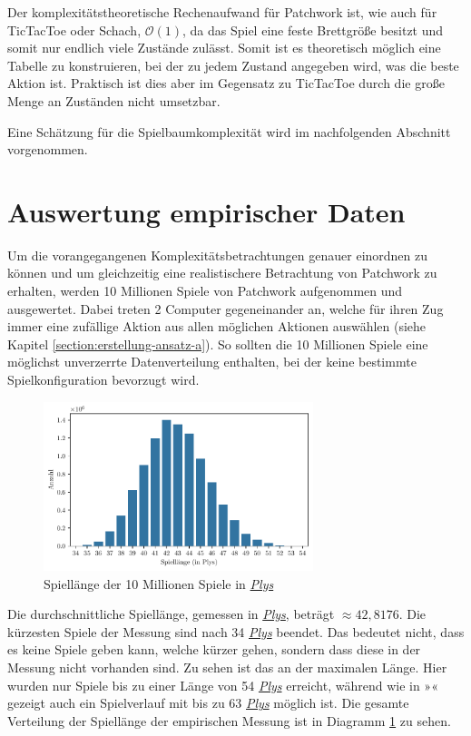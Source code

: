 Der komplexitätstheoretische Rechenaufwand für Patchwork ist, wie auch für TicTacToe oder Schach, $\mathcal{O}(1)$, da das Spiel eine feste Brettgröße besitzt und somit nur endlich viele Zustände zulässt. Somit ist es theoretisch möglich eine Tabelle zu konstruieren, bei der zu jedem Zustand angegeben wird, was die beste Aktion ist. Praktisch ist dies aber im Gegensatz zu TicTacToe durch die große Menge an Zuständen nicht umsetzbar.

Eine Schätzung für die Spielbaumkomplexität wird im nachfolgenden Abschnitt vorgenommen.

\section{Auswertung empirischer Daten}

Um die vorangegangenen Komplexitätsbetrachtungen genauer einordnen zu können und um gleichzeitig eine realistischere Betrachtung von Patchwork zu erhalten, werden 10 Millionen Spiele von Patchwork aufgenommen und ausgewertet. Dabei treten 2 Computer gegeneinander an, welche für ihren Zug immer eine zufällige Aktion aus allen möglichen Aktionen auswählen (siehe Kapitel \ref{section:erstellung-ansatz-a}). So sollten die 10 Millionen Spiele eine möglichst unverzerrte Datenverteilung enthalten, bei der keine bestimmte Spielkonfiguration bevorzugt wird.

\begin{figure}[!ht]
    \centering
    \includegraphics[width=0.7\textwidth]{res/pictures/plots/game_lengths.pdf}
    \caption{Spiellänge der 10 Millionen Spiele in \hyperref[text:ply]{\emph{Plys}}}
    \label{fig:plot-game-length-10-million}
\end{figure}

Die durchschnittliche Spiellänge, gemessen in \hyperref[text:ply]{\emph{Plys}}, beträgt ${\approx}42{,}8176$. Die kürzesten Spiele der Messung sind nach 34 \hyperref[text:ply]{\emph{Plys}} beendet. Das bedeutet nicht, dass es keine Spiele geben kann, welche kürzer gehen, sondern dass diese in der Messung nicht vorhanden sind. Zu sehen ist das an der maximalen Länge. Hier wurden nur Spiele bis zu einer Länge von 54 \hyperref[text:ply]{\emph{Plys}} erreicht, während wie in »« gezeigt auch ein Spielverlauf mit bis zu 63 \hyperref[text:ply]{\emph{Plys}} möglich ist. Die gesamte Verteilung der Spiellänge der empirischen Messung ist in Diagramm \ref{fig:plot-game-length-10-million} zu sehen.


